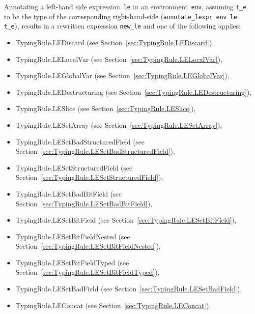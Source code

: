 \documentclass{book}
\begin{document}
Annotating a left-hand side expression~\texttt{le} in an environment~\texttt{env}, assuming \texttt{t\_e}
to be the type of the corresponding right-hand-side (\texttt{annotate\_lexpr
env le t\_e}), results in a rewritten expression \texttt{new\_le} and one of the following
applies:
\begin{itemize}
\item TypingRule.LEDiscard (see Section~\ref{sec:TypingRule.LEDiscard}),
\item TypingRule.LELocalVar (see Section~\ref{sec:TypingRule.LELocalVar}),
\item TypingRule.LEGlobalVar (see Section~\ref{sec:TypingRule.LEGlobalVar}),
\item TypingRule.LEDestructuring (see Section~\ref{sec:TypingRule.LEDestructuring}),
\item TypingRule.LESlice (see Section~\ref{sec:TypingRule.LESlice}),
\item TypingRule.LESetArray (see Section~\ref{sec:TypingRule.LESetArray}),
\item TypingRule.LESetBadStructuredField (see Section~\ref{sec:TypingRule.LESetBadStructuredField}),
\item TypingRule.LESetStructuredField (see Section~\ref{sec:TypingRule.LESetStructuredField}),
\item TypingRule.LESetBadBitField (see Section~\ref{sec:TypingRule.LESetBadBitField}),
\item TypingRule.LESetBitField (see Section~\ref{sec:TypingRule.LESetBitField}),
\item TypingRule.LESetBitFieldNested (see Section~\ref{sec:TypingRule.LESetBitFieldNested}),
\item TypingRule.LESetBitFieldTyped (see Section~\ref{sec:TypingRule.LESetBitFieldTyped}),
\item TypingRule.LESetBadField (see Section~\ref{sec:TypingRule.LESetBadField}),
\item TypingRule.LEConcat (see Section~\ref{sec:TypingRule.LEConcat}).
\end{itemize}
\end{document}
